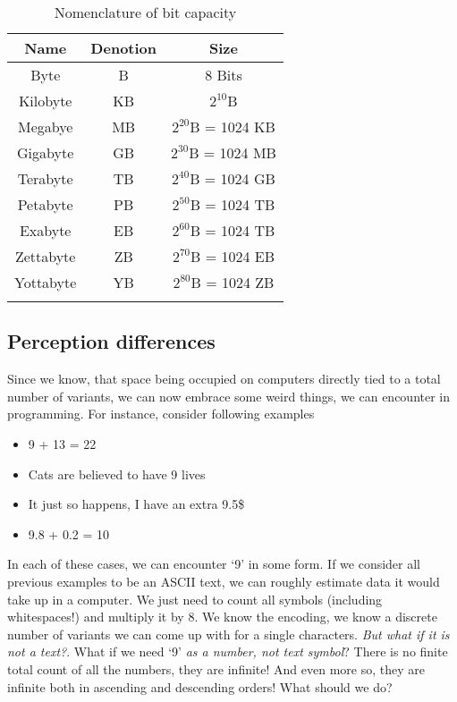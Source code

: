 \documentclass[../../what-is-computer.tex]{subfiles}
\begin{document}
    \begin{table}[h]
        \centering
        \begin{longtable}{ccc}
            \toprule
            Name & Denotion & Size \\
            \toprule
            Byte & B & 8 Bits \\
            Kilobyte & KB & $2^{10}$B \\
            Megabye & MB & $2^{20}$B = 1024 KB \\
            Gigabyte & GB & $2^{30}$B = 1024 MB \\
            Terabyte & TB & $2^{40}$B = 1024 GB \\
            Petabyte & PB & $2^{50}$B = 1024 TB \\
            Exabyte & EB & $2^{60}$B = 1024 TB \\
            Zettabyte & ZB & $2^{70}$B = 1024 EB \\
            Yottabyte & YB & $2^{80}$B = 1024 ZB \\
            \bottomrule
            \caption{Nomenclature of bit capacity}
        \end{longtable}
    \end{table}

    \subsection{Perception differences}

    Since we know, that space being occupied on computers directly tied to a total number of variants, we can now embrace some weird things, we can encounter
    in programming. For instance, consider following examples

    \begin{itemize}
        \item 9 + 13 = 22
        \item Cats are believed to have 9 lives
        \item It just so happens, I have an extra 9.5\$
        \item 9.8 + 0.2 = 10
    \end{itemize}

    In each of these cases, we can encounter `9' in some form. If we consider all previous examples to be an ASCII text, we can roughly estimate data it would take up in 
    a computer. We just need to count all symbols (including whitespaces!) and multiply it by 8. We know the encoding, we know a discrete number of variants we can
    come up with for a single characters. \emph{But what if it is not a text?}. What if we need `9' \emph{as a number, not text symbol}? There is no finite total count
    of all the numbers, they are infinite! And even more so, they are infinite both in ascending and descending orders! What should we do? \par
\end{document}
